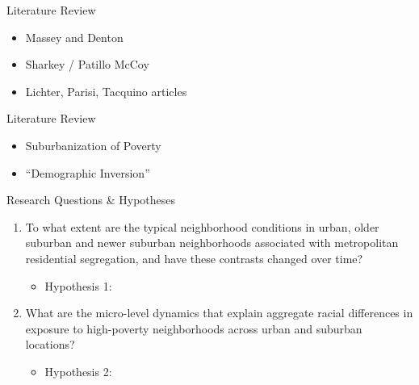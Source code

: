 

\begin{frame}{Literature Review}
\begin{itemize}
    \item Massey and Denton
    \item Sharkey / Patillo McCoy
    \item Lichter, Parisi, Tacquino articles
\end{itemize}
\end{frame}

\begin{frame}{Literature Review}
\begin{itemize}
    \item Suburbanization of Poverty
    \item ``Demographic Inversion''
\end{itemize}
\end{frame}

\begin{frame}{Research Questions \& Hypotheses}
    \begin{enumerate}
        \item To what extent are the typical neighborhood conditions in urban, older suburban and newer suburban neighborhoods associated with metropolitan residential segregation, and have these contrasts changed over time?
        \begin{itemize}
            \item Hypothesis 1:
        \end{itemize}
        \item What are the micro-level dynamics that explain aggregate racial differences in exposure to high-poverty neighborhoods across urban and suburban locations?
        \begin{itemize}
            \item Hypothesis 2:
        \end{itemize}
    \end{enumerate}
\end{frame}